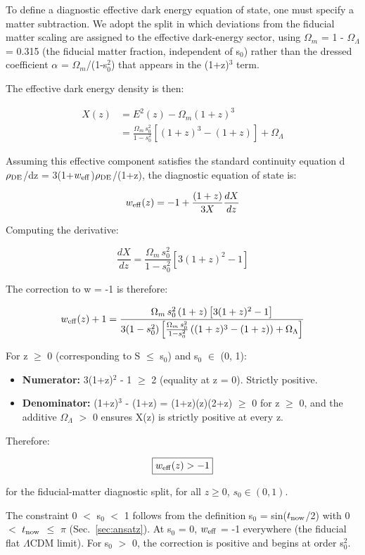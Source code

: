 To define a diagnostic effective dark energy equation of state, one must
specify a matter subtraction. We adopt the split in which deviations
from the fiducial matter scaling are assigned to the effective
dark-energy sector, using $\Omega_m$ = 1 - $\Omega_\Lambda$ = 0.315 (the fiducial matter
fraction, independent of s$_0$) rather than the dressed coefficient $\alpha$ =
$\Omega_m$/(1-s$_0^2$) that appears in the (1+z)$^3$ term.

The effective dark energy density is then:

\[\begin{aligned}
X(z) &= E^2(z) - \Omega_m(1+z)^3 \\
     &= \frac{\Omega_m\, s_0^2}{1 - s_0^2}\left[(1+z)^3 - (1+z)\right] + \Omega_\Lambda
\end{aligned}\]

Assuming this effective component satisfies the standard continuity
equation d$\rho_{\rm DE}$/dz = 3(1+$w_{\rm eff}$)$\rho_{\rm DE}$/(1+z), the diagnostic equation of
state is:

\[w_{\rm eff}(z) = -1 + \frac{(1+z)}{3X}\frac{dX}{dz}\]

Computing the derivative:

\[\frac{dX}{dz} = \frac{\Omega_m\, s_0^2}{1 - s_0^2}\left[3(1+z)^2 - 1\right]\]

The correction to w = -1 is therefore:

\[w_{\rm eff}(z) + 1 = \frac{\Omega_m\, s_0^2\,(1+z)\left[3(1+z)^2 - 1\right]}{3(1 - s_0^2)\left[\frac{\Omega_m\, s_0^2}{1 - s_0^2}\left((1+z)^3 - (1+z)\right) + \Omega_\Lambda\right]}\]

For z $\geq$ 0 (corresponding to S $\leq$ s$_0$) and s$_0$ $\in$ (0, 1):

\begin{itemize}
\tightlist
\item
  \textbf{Numerator:} 3(1+z)$^2$ - 1 $\geq$ 2 (equality at z = 0). Strictly
  positive.
\item
  \textbf{Denominator:} (1+z)$^3$ - (1+z) = (1+z)(z)(2+z) $\geq$ 0 for z $\geq$ 0,
  and the additive $\Omega_\Lambda$ $>$ 0 ensures X(z) is strictly
  positive at every z.
\end{itemize}

Therefore:

\[\boxed{w_{\rm eff}(z) > -1}\]

for the fiducial-matter diagnostic split, for all \(z \geq 0\),
\(s_0 \in (0, 1)\).

The constraint 0 $<$ s$_0$ $<$ 1 follows from the
definition s$_0$ = sin($t_{\rm now}$/2) with 0 $<$ $t_{\rm now}$ $\leq$ $\pi$ (Sec.~\ref{sec:ansatz}). At
s$_0$ = 0, $w_{\rm eff}$ = -1 everywhere (the fiducial flat $\Lambda$CDM limit). For s$_0$
$>$ 0, the correction is positive and begins at order s$_0^2$.

